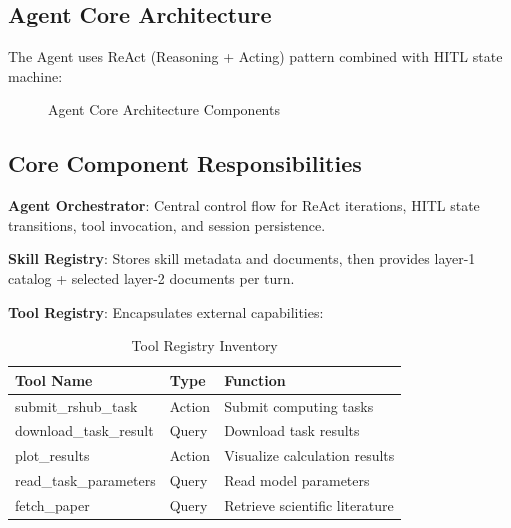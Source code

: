 \subsection{Agent Core Architecture}

The Agent uses ReAct (Reasoning + Acting) pattern combined with HITL state machine:

\begin{figure}[H]
	\centering
	\caption{Agent Core Architecture Components}
\end{figure}

\subsection{Core Component Responsibilities}

\textbf{Agent Orchestrator}: Central control flow for ReAct iterations, HITL state transitions, tool invocation, and session persistence.

\textbf{Skill Registry}: Stores skill metadata and documents, then provides layer-1 catalog + selected layer-2 documents per turn.

\textbf{Tool Registry}: Encapsulates external capabilities:

\begin{table}[H]
	\centering
	\caption{Tool Registry Inventory}
	\begin{tabular}{@{}llp{5cm}@{}}
		\toprule
		\textbf{Tool Name} & \textbf{Type} & \textbf{Function} \\
		\midrule
		submit\_rshub\_task & Action & Submit computing tasks \\
		download\_task\_result & Query & Download task results \\
		plot\_results & Action & Visualize calculation results \\
		read\_task\_parameters & Query & Read model parameters \\
		fetch\_paper & Query & Retrieve scientific literature \\
		\bottomrule
	\end{tabular}
\end{table}

